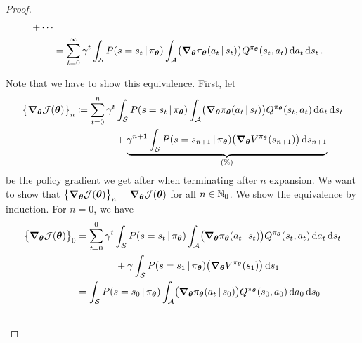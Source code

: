 \begin{proof}
\begin{align}
				+ \cdots                                                                                                                                                                                                                                 \\
				 & = \sum_{t = 0}^{\infty} \gamma^t \int_{\mathcal{S}} P(s = s_t \,\vert\, \pi_{\bm{\theta}}) \int_{\mathcal{A}} \bigl( \grad_{\bm{\theta}} \pi_{\bm{\theta}}(a_t \,\vert\, s_t) \bigr) Q^{\pi_{\bm{\theta}}}(s_t, a_t) \dd{a_t} \dd{s_t}.
			\end{align}

			Note that we have to show this equivalence. First, let
			\begin{align}
				\bigl\{ \grad_{\bm{\theta}} \mathcal{J}(\bm{\theta}) \bigr\}_n
				 & \coloneqq \sum_{t = 0}^{n} \gamma^t \int_{\mathcal{S}} P(s = s_t \,\vert\, \pi_{\bm{\theta}}) \int_{\mathcal{A}} \bigl( \grad_{\bm{\theta}} \pi_{\bm{\theta}}(a_t \,\vert\, s_t) \bigr) Q^{\pi_{\bm{\theta}}}(s_t, a_t) \dd{a_t} \dd{s_t} \\&\qquad\qquad
				+ \underbrace{\gamma^{n + 1} \int_\mathcal{S} P(s = s_{n + 1} \,\vert\, \pi_{\bm{\theta}}) \bigl( \grad_{\bm{\theta}} V^{\pi_{\bm{\theta}}}(s_{n + 1}) \bigr) \dd{s_{n + 1}}}_{(\%)}  \label{eq:pgtProofSum}
			\end{align}
			be the policy gradient we get after when terminating after \(n\) expansion. We want to show that \( \bigl\{ \grad_{\bm{\theta}} \mathcal{J}(\bm{\theta}) \bigr\}_n = \grad_{\bm{\theta}} \mathcal{J}(\bm{\theta}) \) for all \( n \in \mathbb{N}_0 \). We show the equivalence by induction. For \(n = 0\), we have
			\begin{align}
				\bigl\{ \grad_{\vec{\theta}} \mathcal{J}(\vec{\theta}) \bigr\}_0
				 & = \sum_{t = 0}^{0} \gamma^t \int_{\mathcal{S}} P(s = s_t \given \pi_{\vec{\theta}}) \int_{\mathcal{A}} \bigl( \grad_{\vec{\theta}} \pi_{\vec{\theta}}(a_t \given s_t) \bigr) Q^{\pi_{\vec{\theta}}}(s_t, a_t) \dd{a_t} \dd{s_t} \\&\qquad\qquad
				+ \gamma \int_\mathcal{S} P(s = s_1 \given \pi_{\vec{\theta}}) \bigl( \grad_{\vec{\theta}} V^{\pi_{\vec{\theta}}}(s_1) \bigr) \dd{s_1}                                                                                             \\
				 & = \int_{\mathcal{S}} P(s = s_0 \given \pi_{\vec{\theta}}) \int_{\mathcal{A}} \bigl( \grad_{\vec{\theta}} \pi_{\vec{\theta}}(a_t \given s_0) \bigr) Q^{\pi_{\vec{\theta}}}(s_0, a_0) \dd{a_0} \dd{s_0}                           \\&\qquad\qquad

\end{align}
\end{proof}
